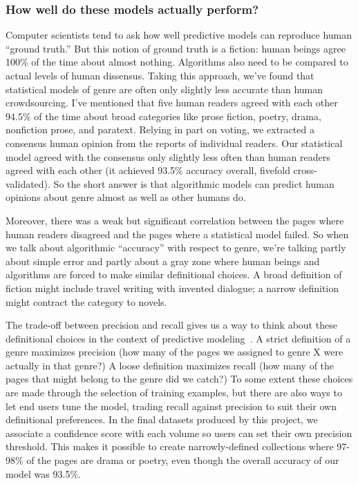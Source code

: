 \documentclass[paper=a4, fontsize=12pt]{scrartcl}
\numberwithin{equation}{section}		%
\numberwithin{figure}{section}			%
\numberwithin{table}{section}				%
\begin{document}
\subsubsection{How well do these models actually perform?}

Computer scientists tend to ask how well predictive models can reproduce human ``ground truth.'' But this notion of ground truth is a fiction: human beings agree 100\% of the time about almost nothing. Algorithms also need to be compared to actual levels of human dissensus. Taking this approach, we've found that statistical models of genre are often only slightly less accurate than human crowdsourcing. I've mentioned that five human readers agreed with each other 94.5\% of the time about broad categories like prose fiction, poetry, drama, nonfiction prose, and paratext. Relying in part on voting, we extracted a consensus human opinion from the reports of individual readers. Our statistical model agreed with the consensus only slightly less often than human readers agreed with each other (it achieved 93.5\% accuracy overall, fivefold cross-validated). So the short answer is that algorithmic models can predict human opinions about genre almost as well as other humans do.

Moreover, there was a weak but significant correlation between the pages where human readers disagreed and the pages where a statistical model failed. So when we talk about algorithmic ``accuracy'' with respect to genre, we're talking partly about simple error and partly about a gray zone where human beings and algorithms are forced to make similar definitional choices. A broad definition of fiction might include travel writing with invented dialogue; a narrow definition might contract the category to novels.

The trade-off between precision and recall gives us a way to think about these definitional choices in the context of predictive modeling~\cite{buckland:recall}. A strict definition of a genre maximizes precision (how many of the pages we assigned to genre X were actually in that genre?) A loose definition maximizes recall (how many of the pages that might belong to the genre did we catch?) To some extent these choices are made through the selection of training examples, but there are also ways to let end users tune the model, trading recall against precision to suit their own definitional preferences. In the final datasets produced by this project, we associate a confidence score with each volume so users can set their own precision threshold. This makes it possible to create narrowly-defined collections where 97-98\% of the pages are drama or poetry, even though the overall accuracy of our model was 93.5\%.
\end{document}
